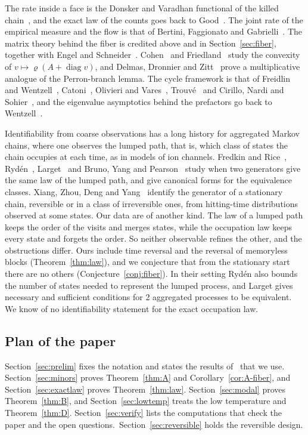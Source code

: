 The rate inside a face is the Donsker and Varadhan functional of the killed
chain~\cite{dv1975}, and the exact law of the counts goes back to Good~\cite{good1961}. The joint
rate of the empirical measure and the flow is that of Bertini, Faggionato and
Gabrielli~\cite{bfg2014,bfg2015}. The matrix theory behind the fiber is credited above and in
Section~\ref{sec:fiber}, together with Engel and Schneider~\cite{engelschneider1980}.
Cohen~\cite{cohen1981} and Friedland~\cite{friedland1981} study the convexity of
$v\mapsto\varrho(A+\operatorname{diag}v)$, and Delmas, Dronnier and Zitt~\cite{ddz2024} prove a
multiplicative analogue of the Perron-branch lemma. The cycle framework is that of Freidlin and
Wentzell~\cite{freidlinwentzell2012}, Catoni~\cite{catoni1999}, Olivieri and
Vares~\cite{olivierivares2005}, Trouv\'e~\cite{trouve1996} and Cirillo, Nardi and
Sohier~\cite{cirillonardisohier2015}, and the eigenvalue asymptotics behind the prefactors go back
to Wentzell~\cite{wentzell1972}.

Identifiability from coarse observations has a long history for aggregated Markov chains, where
one observes the lumped path, that is, which class of states the chain occupies at each time, as
in models of ion channels. Fredkin and Rice~\cite{fredkinrice1986}, Ryd\'en~\cite{ryden1996},
Larget~\cite{larget1998} and Bruno, Yang and Pearson~\cite{brunoyangpearson2005} study when two
generators give the same law of the lumped path, and give canonical forms for the equivalence
classes. Xiang, Zhou, Deng and Yang~\cite{xzdy2024} identify the generator of a stationary chain,
reversible or in a class of irreversible ones, from hitting-time distributions observed at some
states. Our data are of another kind. The law of a lumped path keeps the order of the visits and
merges states, while the occupation law keeps every state and forgets the order. So neither
observable refines the other, and the obstructions differ. Ours include time reversal and the
reversal of memoryless blocks (Theorem~\ref{thm:law}), and we conjecture that from the stationary
start there are no others (Conjecture~\ref{conj:fiber}). In their setting Ryd\'en also bounds the
number of states needed to represent the lumped process, and Larget gives necessary and
sufficient conditions for 2 aggregated processes to be equivalent. We know of no
identifiability statement for the exact occupation law.

\subsection{Plan of the paper}\label{sec:plan}

Section~\ref{sec:prelim} fixes the notation and states the results of~\cite{paperC1} that we use.
Section~\ref{sec:minors} proves Theorem~\ref{thm:A} and Corollary~\ref{cor:A-fiber}, and
Section~\ref{sec:exactlaw} proves Theorem~\ref{thm:law}. Section~\ref{sec:modal} proves Theorem~\ref{thm:B}, and Section~\ref{sec:lowtemp} treats the low
temperature and Theorem~\ref{thm:D}. Section~\ref{sec:verify} lists the computations that check
the paper and the open questions.\ifarxivbuild\ Section~\ref{sec:reversible} holds the reversible
design.\fi
